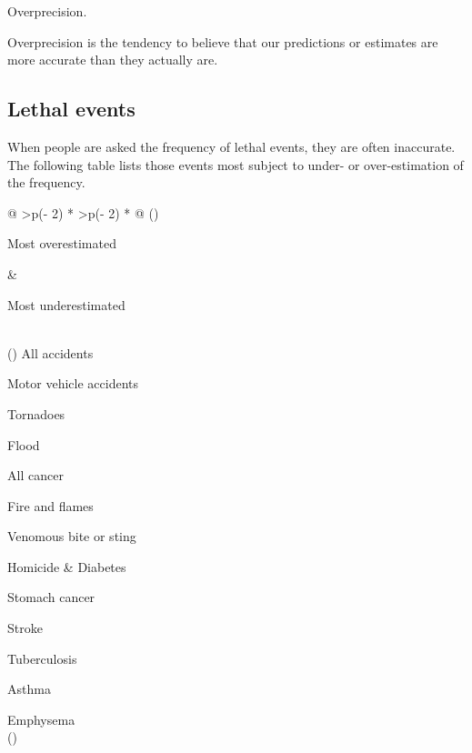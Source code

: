 \documentclass[
  letterpaper,
  DIV=11,
  numbers=noendperiod]{scrreprt}
\begin{document}
\begin{tcolorbox}[enhanced jigsaw, title=\textcolor{quarto-callout-tip-color}{\faLightbulb}\hspace{0.5em}{Answer}, toprule=.15mm, colback=white, breakable, titlerule=0mm, colframe=quarto-callout-tip-color-frame, coltitle=black, opacityback=0, rightrule=.15mm, colbacktitle=quarto-callout-tip-color!10!white, bottomtitle=1mm, opacitybacktitle=0.6, arc=.35mm, bottomrule=.15mm, toptitle=1mm, leftrule=.75mm, left=2mm]

Overprecision.

Overprecision is the tendency to believe that our predictions or
estimates are more accurate than they actually are.

\end{tcolorbox}

\hypertarget{lethal-events}{%
\subsection{Lethal events}\label{lethal-events}}

When people are asked the frequency of lethal events, they are often
inaccurate. The following table lists those events most subject to
under- or over-estimation of the frequency.

\begin{longtable}[]{@{}
  >{\centering\arraybackslash}p{(\columnwidth - 2\tabcolsep) * }
  >{\centering\arraybackslash}p{(\columnwidth - 2\tabcolsep) * }@{}}
\toprule()
\begin{minipage}[b]{\linewidth}\centering
Most overestimated
\end{minipage} & \begin{minipage}[b]{\linewidth}\centering
Most underestimated
\end{minipage} \\
\midrule()
\endhead
All accidents

Motor vehicle accidents

Tornadoes

Flood

All cancer

Fire and flames

Venomous bite or sting

Homicide & Diabetes

Stomach cancer

Stroke

Tuberculosis

Asthma

Emphysema \\
\bottomrule()
\end{longtable}
\end{document}
